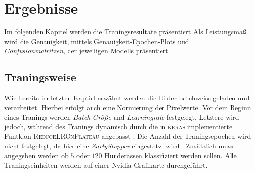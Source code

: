 \section{Ergebnisse}
Im folgenden Kapitel werden die Traningsresultate präsentiert
Als Leistungsmaß wird die Genauigkeit, mittels Genauigkeit-Epochen-Plots
und \emph{Confusionmatritzen}, der jeweiligen Modells präsentiert.

\subsection{Traningsweise}
Wie bereits im letzten Kaptiel erwähnt werden die
Bilder batchweise geladen und verarbeitet. Hierbei erfolgt auch eine Normierung
der Pixelwerte. Vor dem Beginn eines Tranings werden \emph{Batch-Größe} und
\emph{Learningrate} festgelegt. Letztere wird jedoch, während des Tranings dynamisch
durch die in \textsc{keras} implementierte Funtkion \textsc{ReduceLROnPlateau}
angepasst \cite{keras_ReduceLROnPlateau}. Die Anzahl der Traningsepochen
wird nicht festgelegt, da hier eine \emph{EarlyStopper} eingestetzt wird \cite{keras_EarlyStopping}.
Zusätzlich muss angegeben werden ob $5$ oder $120$ Hunderassen
klassifiziert werden sollen. Alle Traningseinheiten werden auf einer Nvidia-Grafikarte
durchgeführt.

